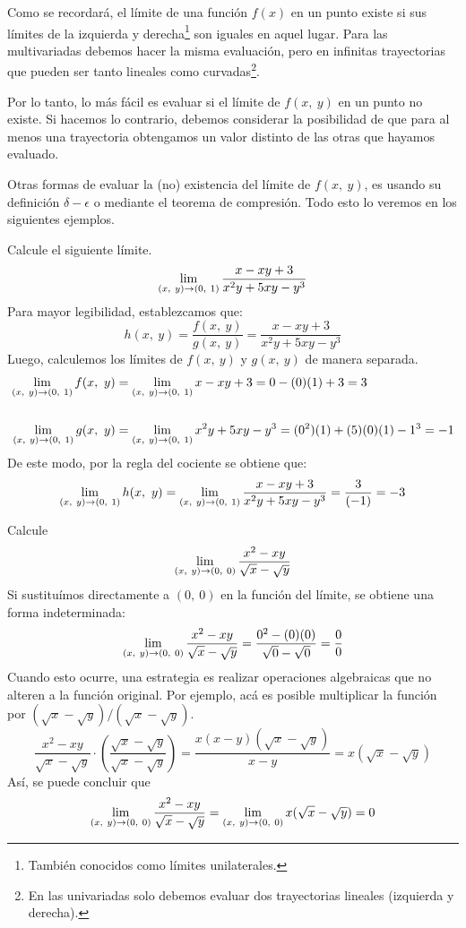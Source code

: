 \documentclass[12pt]{article}
\begin{document}
Como se recordará, el límite de una función $f(x)$ en un punto existe si sus límites de la izquierda y derecha\footnote{También conocidos como límites unilaterales.} son iguales en aquel lugar. Para las multivariadas debemos hacer la misma evaluación, pero en infinitas trayectorias que pueden ser tanto lineales como curvadas\footnote{En las univariadas solo debemos evaluar dos trayectorias lineales (izquierda y derecha).}.

Por lo tanto, lo más fácil es evaluar si el límite de $f(x, \ y)$ en un punto no existe. Si hacemos lo contrario, debemos considerar la posibilidad de que para al menos una trayectoria obtengamos un valor distinto de las otras que hayamos evaluado.

Otras formas de evaluar la (no) existencia del límite de $f(x, \ y)$, es usando su definición $\delta - \epsilon$ o mediante el teorema de compresión. Todo esto lo veremos en los siguientes ejemplos.

\ejemplo Calcule el siguiente límite.
\[
  \lim_{(x, \ y) \to (0, \ 1)} \frac{x - xy + 3}{x^{2}y + 5xy - y^{3}}
\]
\solucion Para mayor legibilidad, establezcamos que:
\[
  h(x, \ y) = \frac{f(x, \ y)}{g(x, \ y)} = \frac{x - xy + 3}{x^{2}y + 5xy - y^{3}}
\]
Luego, calculemos los límites de $f(x, \ y)$ y $g(x, \ y)$ de manera separada.
\begin{align*}
  \lim_{(x, \ y) \to (0, \ 1)} f(x, \ y) &= \lim_{(x, \ y) \to (0, \ 1)} x - xy + 3 = 0 - (0)(1) + 3 = 3 \\ \\
  \lim_{(x, \ y) \to (0, \ 1)} g(x, \ y) &= \lim_{(x, \ y) \to (0, \ 1)} x^{2}y + 5xy - y^{3} = (0^{2})(1) + (5)(0)(1) - 1^{3} = -1
\end{align*}
De este modo, por la regla del cociente se obtiene que:
\[
  \lim_{(x, \ y) \to (0, \ 1)} h(x, \ y) = \lim_{(x, \ y) \to (0, \ 1)} \frac{x - xy + 3}{x^{2}y + 5xy - y^{3}}
                            = \frac{3}{(-1)}
                            = -3
\]

\ejemplo Calcule
\[
  \lim_{(x, \ y) \to (0, \ 0)} \frac{x^{2} - xy}{\sqrt{x} - \sqrt{y}}
\]
\solucion Si sustituímos directamente a $(0, \ 0)$ en la función del límite, se obtiene una forma indeterminada:
\[
  \lim_{(x, \ y) \to (0, \ 0)} \frac{x^{2} - xy}{\sqrt{x} - \sqrt{y}} = \frac{0^{2} - (0)(0)}{\sqrt{0} - \sqrt{0}}
                                                         = \frac{0}{0}
\]
Cuando esto ocurre, una estrategia es realizar operaciones algebraicas que no alteren a la función original. Por ejemplo, acá es posible multiplicar la función por $(\sqrt{x} - \sqrt{y})/(\sqrt{x} - \sqrt{y})$.
\[
  \frac{x^{2} - xy}{\sqrt{x} - \sqrt{y}} \cdot \left(\frac{\sqrt{x} - \sqrt{y}}{\sqrt{x} - \sqrt{y}}\right) =
    \frac{x(x - y)(\sqrt{x} - \sqrt{y})}{x - y} = x(\sqrt{x} - \sqrt{y})
\]
Así, se puede concluir que
\[
 \lim_{(x, \ y) \to (0, \ 0)} \frac{x^{2} - xy}{\sqrt{x} - \sqrt{y}} = \lim_{(x, \ y) \to (0, \ 0)} x(\sqrt{x} - \sqrt{y}) = 0
\]
\end{document}
